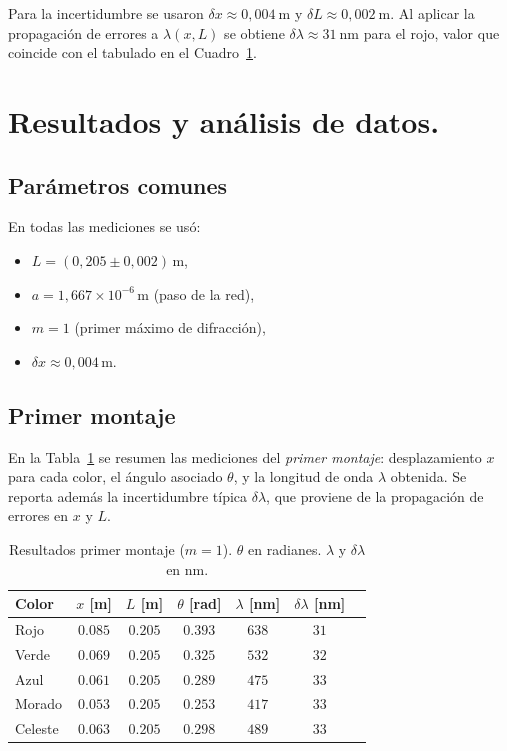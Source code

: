 \documentclass[11pt,twocolumn]{article}
\begin{document}
Para la incertidumbre se usaron $\delta x \approx 0{,}004\ \text{m}$ y $\delta L \approx 0{,}002\ \text{m}$. Al aplicar la propagación de errores a $\lambda(x,L)$ se obtiene $\delta\lambda \approx 31\ \text{nm}$ para el rojo, valor que coincide con el tabulado en el Cuadro~\ref{tab:montaje1}.



\section{Resultados y análisis de datos.}

\subsection{Parámetros comunes}
En todas las mediciones se usó:
\begin{itemize}
    \item $L = (0{,}205 \pm 0{,}002)\,\text{m}$,
    \item $a = 1{,}667\times10^{-6}\,\text{m}$ (paso de la red),
    \item $m = 1$ (primer máximo de difracción),
    \item $\delta x \approx 0{,}004\,\text{m}$.
\end{itemize}

\subsection{Primer montaje}
En la Tabla~\ref{tab:montaje1} se resumen las mediciones del \textit{primer montaje}: desplazamiento $x$ para cada color, el ángulo asociado $\theta$, y la longitud de onda $\lambda$ obtenida. Se reporta además la incertidumbre típica $\delta\lambda$, que proviene de la propagación de errores en $x$ y $L$.

\begin{table}
    \centering
    \caption{Resultados primer montaje ($m=1$). $\theta$ en radianes. $\lambda$ y $\delta\lambda$ en nm.}
    \label{tab:montaje1}
    \begin{tabular}{lcccccc}
        \toprule
        Color &
        $x$ [m] &
        $L$ [m] &
        $\theta$ [rad] &
        $\lambda$ [nm] &
        $\delta\lambda$ [nm] \\
        \midrule
        Rojo    & $0.085$ & $0.205$ & $0.393$ & $638$ & $31$ \\
        Verde   & $0.069$ & $0.205$ & $0.325$ & $532$ & $32$ \\
        Azul    & $0.061$ & $0.205$ & $0.289$ & $475$ & $33$ \\
        Morado  & $0.053$ & $0.205$ & $0.253$ & $417$ & $33$ \\
        Celeste & $0.063$ & $0.205$ & $0.298$ & $489$ & $33$ \\
        \bottomrule
    \end{tabular}
\end{table}
\end{document}
